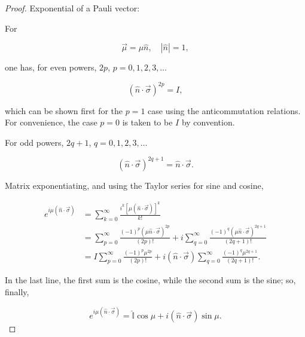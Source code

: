\begin{proof}
	Exponential of a Pauli vector:

For 

\[
\vec{\mu} = \mu \hat{n}, \quad |\hat{n}| = 1,
\]

one has, for even powers, \(2p\), \(p = 0, 1, 2, 3, \ldots\)

\[
(\hat{n} \cdot \vec{\sigma})^{2p} = I,
\]

which can be shown first for the \(p = 1\) case using the anticommutation relations. For convenience, the case \(p = 0\) is taken to be \(I\) by convention.

For odd powers, \(2q + 1\), \(q = 0, 1, 2, 3, \ldots\)

\[
(\hat{n} \cdot \vec{\sigma})^{2q+1} = \hat{n} \cdot \vec{\sigma}.
\]

Matrix exponentiating, and using the Taylor series for sine and cosine,

\begin{align*}
	e^{i\mu(\hat{n} \cdot \vec{\sigma})} &= \sum_{k=0}^{\infty} \frac{i^k [\mu (\hat{n} \cdot \vec{\sigma})]^k}{k!} \\
	&= \sum_{p=0}^{\infty} \frac{(-1)^p (\mu \hat{n} \cdot \vec{\sigma})^{2p}}{(2p)!} 
	+ i \sum_{q=0}^{\infty} \frac{(-1)^q (\mu \hat{n} \cdot \vec{\sigma})^{2q+1}}{(2q+1)!} \\
	&= I \sum_{p=0}^{\infty} \frac{(-1)^p \mu^{2p}}{(2p)!} + i (\hat{n} \cdot \vec{\sigma}) 
	\sum_{q=0}^{\infty} \frac{(-1)^q \mu^{2q+1}}{(2q+1)!}.
\end{align*}


In the last line, the first sum is the cosine, while the second sum is the sine; so, finally,

\[
e^{i\mu(\hat{n} \cdot \vec{\sigma})} = \mathbb{\hat{I}} \cos \mu + i (\hat{n} \cdot \vec{\sigma}) \sin \mu.
\]
\end{proof}


